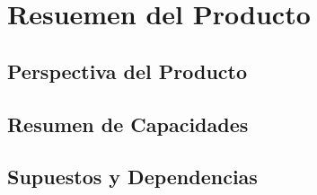 \documentclass[11pt]{article}
\begin{document}
\newpage
\section{Resuemen del Producto}

\subsection{Perspectiva del Producto}

\subsection{Resumen de Capacidades}


\subsection{Supuestos y Dependencias}
\end{document}
